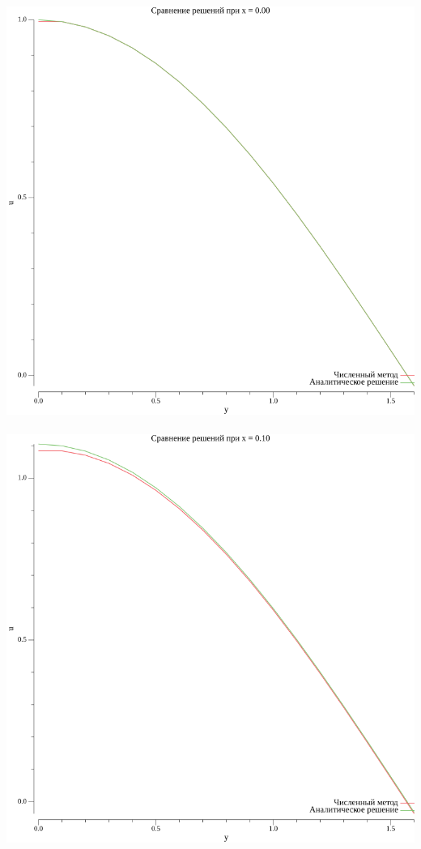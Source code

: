 \documentclass{article}
\begin{document}
\\
\includegraphics[scale=0.6]{0plot_x_0.00.png}
\\

\\
\includegraphics[scale=0.6]{0plot_x_0.10.png}
\\
\end{document}
